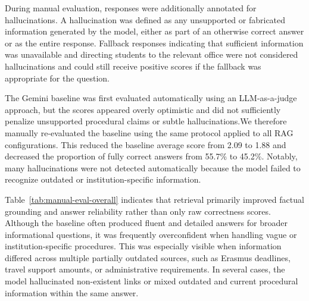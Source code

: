 \documentclass[fleqn,moreauthors,10pt]{ds_report}
\begin{document}
During manual evaluation, responses were additionally annotated for hallucinations. A hallucination was defined as any unsupported or fabricated information generated by the model, either as part of an otherwise correct answer or as the entire response. Fallback responses indicating that sufficient information was unavailable and directing students to the relevant office were not considered hallucinations and could still receive positive scores if the fallback was appropriate for the question.

The Gemini baseline was first evaluated automatically using an LLM-as-a-judge approach, but the scores appeared overly optimistic and did not sufficiently penalize unsupported procedural claims or subtle hallucinations.We therefore manually re-evaluated the baseline using the same protocol applied to all RAG configurations. This reduced the baseline average score from 2.09 to 1.88 and decreased the proportion of fully correct answers from 55.7\% to 45.2\%. Notably, many hallucinations were not detected automatically because the model failed to recognize outdated or institution-specific information.


\begin{table}[h]
\centering
\small
{}
\caption{Manual evaluation results across the baseline and RAG configurations.}
\label{tab:manual-eval-overall}
\end{table}


Table~\ref{tab:manual-eval-overall} indicates that retrieval primarily improved factual grounding and answer reliability rather than only raw correctness scores. Although the baseline often produced fluent and detailed answers for broader informational questions, it was frequently overconfident when handling vague or institution-specific procedures. This was especially visible when information differed across multiple partially outdated sources, such as Erasmus deadlines, travel support amounts, or administrative requirements. In several cases, the model hallucinated non-existent links or mixed outdated and current procedural information within the same answer.
\end{document}

